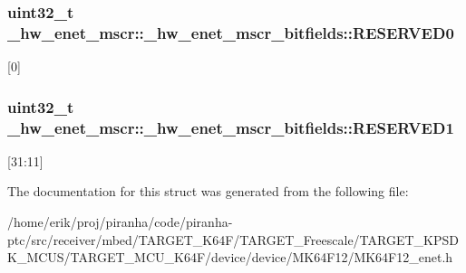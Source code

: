 \subsubsection[{\texorpdfstring{R\+E\+S\+E\+R\+V\+E\+D0}{RESERVED0}}]{\setlength{\rightskip}{0pt plus 5cm}uint32\+\_\+t \+\_\+hw\+\_\+enet\+\_\+mscr\+::\+\_\+hw\+\_\+enet\+\_\+mscr\+\_\+bitfields\+::\+R\+E\+S\+E\+R\+V\+E\+D0}\hypertarget{struct__hw__enet__mscr_1_1__hw__enet__mscr__bitfields_a5bc9b4fb295daeae61d20c8060d98989}{}\label{struct__hw__enet__mscr_1_1__hw__enet__mscr__bitfields_a5bc9b4fb295daeae61d20c8060d98989}
\mbox{[}0\mbox{]} 
\subsubsection[{\texorpdfstring{R\+E\+S\+E\+R\+V\+E\+D1}{RESERVED1}}]{\setlength{\rightskip}{0pt plus 5cm}uint32\+\_\+t \+\_\+hw\+\_\+enet\+\_\+mscr\+::\+\_\+hw\+\_\+enet\+\_\+mscr\+\_\+bitfields\+::\+R\+E\+S\+E\+R\+V\+E\+D1}\hypertarget{struct__hw__enet__mscr_1_1__hw__enet__mscr__bitfields_a627acfeb91f5daebf3cd456f9ece2eef}{}\label{struct__hw__enet__mscr_1_1__hw__enet__mscr__bitfields_a627acfeb91f5daebf3cd456f9ece2eef}
\mbox{[}31\+:11\mbox{]} 

The documentation for this struct was generated from the following file\+:\begin{DoxyCompactItemize}
\item 
/home/erik/proj/piranha/code/piranha-\/ptc/src/receiver/mbed/\+T\+A\+R\+G\+E\+T\+\_\+\+K64\+F/\+T\+A\+R\+G\+E\+T\+\_\+\+Freescale/\+T\+A\+R\+G\+E\+T\+\_\+\+K\+P\+S\+D\+K\+\_\+\+M\+C\+U\+S/\+T\+A\+R\+G\+E\+T\+\_\+\+M\+C\+U\+\_\+\+K64\+F/device/device/\+M\+K64\+F12/M\+K64\+F12\+\_\+enet.\+h\end{DoxyCompactItemize}
